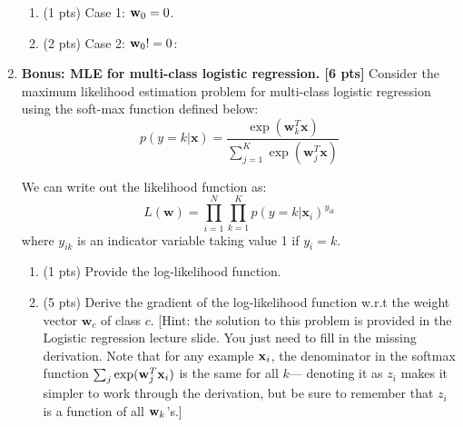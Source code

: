 \documentclass{article}
\newcommand{\mb}[1]{{\mathbf{#1}}}
\def\x{{\bf x}}
\def\w{{\bf w}}
\begin{document}
\begin{enumerate}
\begin{enumerate}
\item (1 pts) Case 1: $\w_0 = 0$. 


\item (2 pts) Case 2: $\w_0 !=0$: 

\end{enumerate}

\item \textbf{Bonus: MLE for multi-class logistic regression. [6 pts]} Consider the maximum likelihood estimation problem for multi-class logistic regression using the soft-max function defined below:
\[p(y=k|\mathbf{x}) = \frac{\exp(\mathbf{w}_k^T\mathbf{x})}{\sum_{j=1}^K \exp(\mathbf{w}_j^T\mathbf{x})}\]

We can write out the likelihood function as:
\[ L({\mb w})=\prod_{i=1}^N\prod_{k=1}^K p(y=k|{\mb x}_i)^{y_{ik}}\] where $y_{ik}$ is an indicator variable taking value 1 if $y_i=k$.
\begin{enumerate}
\item (1 pts) Provide the log-likelihood function.\\

\item (5 pts) Derive the gradient of the log-likelihood function w.r.t the weight vector ${\mb w}_c$ of class $c$.  [Hint: the solution to this problem is provided in the Logistic regression lecture slide. You just need to fill in the missing derivation. Note that for any example $\x_i$, the denominator in the softmax function $\sum_j \exp(\w_j^T\x_i)$ is the same for all $k$--- denoting it as $z_i$ makes it simpler to work through the derivation, but be sure to remember that $z_i$ is a function of all $\w_k$'s.]

\end{enumerate}


%
\end{enumerate}
\end{document}
